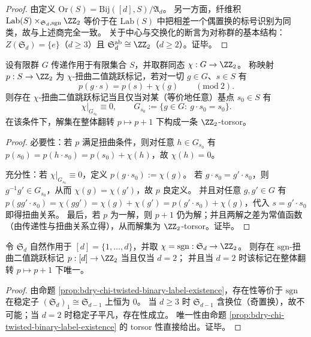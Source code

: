 \begin{proof}
由定义 \(\mathrm{Or}(S)=\mathrm{Bij}([d],S)/\mathfrak A_d\)。
另一方面，纤维积 \(\mathrm{Lab}(S)\times_{\mathfrak S_d,\mathrm{sgn}}\ZZ_2\) 等价于在 \(\mathrm{Lab}(S)\) 中把相差一个偶置换的标号识别为同类，故与上述商完全一致。
关于中心与交换化的断言为对称群的基本结构：\(Z(\mathfrak S_d)=\{e\}\)（\(d\ge 3\)）且 \(\mathfrak S_d^{\mathrm{ab}}\cong\ZZ_2\)（\(d\ge 2\)）。证毕。
\end{proof}

\begin{proposition}[字符扭曲二值跳跃标记的可实现性判别]\label{prop:bdry-chi-twisted-binary-label-existence}
设有限群 \(G\) 传递作用于有限集合 \(S\)，并取群同态 \(\chi:G\to\ZZ_2\)。
称映射 \(p:S\to\ZZ_2\) 为 \(\chi\)-扭曲二值跳跃标记，若对一切 \(g\in G\)、\(s\in S\) 有
\[
p(g\cdot s)=p(s)+\chi(g)\qquad(\mathrm{mod}\ 2).
\]
则存在 \(\chi\)-扭曲二值跳跃标记当且仅当对某（等价地任意）基点 \(s_0\in S\) 有
\[
\chi|_{G_{s_0}}\equiv 0,
\qquad
G_{s_0}:=\{g\in G:\ g\cdot s_0=s_0\}.
\]
在该条件下，解集在整体翻转 \(p\mapsto p+1\) 下构成一条 \(\ZZ_2\)-torsor。
\end{proposition}
\begin{proof}
必要性：若 \(p\) 满足扭曲条件，则对任意 \(h\in G_{s_0}\) 有
\(
p(s_0)=p(h\cdot s_0)=p(s_0)+\chi(h)
\)，故 \(\chi(h)=0\)。
\par
充分性：若 \(\chi|_{G_{s_0}}\equiv 0\)，定义 \(p(g\cdot s_0):=\chi(g)\)。
若 \(g\cdot s_0=g'\cdot s_0\)，则 \(g^{-1}g'\in G_{s_0}\)，从而 \(\chi(g)=\chi(g')\)，故 \(p\) 良定义。
并且对任意 \(g,g'\in G\) 有
\(
p(gg'\cdot s_0)=\chi(gg')=\chi(g)+\chi(g')=p(g'\cdot s_0)+\chi(g)
\)，代入 \(s=g'\cdot s_0\) 即得扭曲关系。
最后，若 \(p\) 为一解，则 \(p+1\) 仍为解；并且两解之差为常值函数（由传递性与扭曲关系立得），从而解集为 \(\ZZ_2\)-torsor。证毕。
\end{proof}

\begin{corollary}[对称群符号特征与二点层标记的刚性]\label{cor:bdry-symmetric-group-sign-twisted-label-d2}
令 \(\mathfrak S_d\) 自然作用于 \([d]=\{1,\dots,d\}\)，并取 \(\chi=\mathrm{sgn}:\mathfrak S_d\to\ZZ_2\)。
则存在 \(\mathrm{sgn}\)-扭曲二值跳跃标记 \(p:[d]\to\ZZ_2\) 当且仅当 \(d=2\)；
并且当 \(d=2\) 时该标记在整体翻转 \(p\mapsto p+1\) 下唯一。
\end{corollary}
\begin{proof}
由命题 \ref{prop:bdry-chi-twisted-binary-label-existence}，存在性等价于 \(\mathrm{sgn}\) 在稳定子 \((\mathfrak S_d)_{1}\cong \mathfrak S_{d-1}\) 上恒为 \(0\)。
当 \(d\ge 3\) 时 \(\mathfrak S_{d-1}\) 含换位（奇置换），故不可能；当 \(d=2\) 时稳定子平凡，存在性成立。
唯一性由命题 \ref{prop:bdry-chi-twisted-binary-label-existence} 的 torsor 性直接给出。证毕。
\end{proof}


